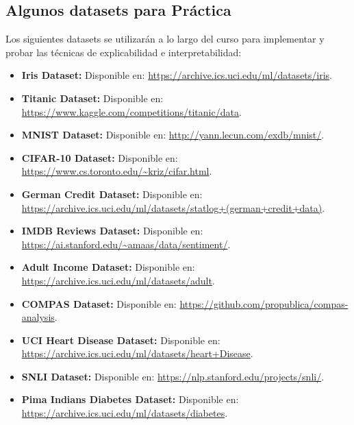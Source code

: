 \subsection*{Algunos datasets para Práctica}
Los siguientes datasets se utilizarán a lo largo del curso para implementar y probar las técnicas de explicabilidad e interpretabilidad:
\begin{itemize}
    \item \textbf{Iris Dataset:} Disponible en: \url{https://archive.ics.uci.edu/ml/datasets/iris}.
    \item \textbf{Titanic Dataset:} Disponible en: \url{https://www.kaggle.com/competitions/titanic/data}.
    \item \textbf{MNIST Dataset:} Disponible en: \url{http://yann.lecun.com/exdb/mnist/}.
    \item \textbf{CIFAR-10 Dataset:} Disponible en: \url{https://www.cs.toronto.edu/~kriz/cifar.html}.
    \item \textbf{German Credit Dataset:} Disponible en: \url{https://archive.ics.uci.edu/ml/datasets/statlog+(german+credit+data)}.
    \item \textbf{IMDB Reviews Dataset:} Disponible en: \url{https://ai.stanford.edu/~amaas/data/sentiment/}.
    \item \textbf{Adult Income Dataset:} Disponible en: \url{https://archive.ics.uci.edu/ml/datasets/adult}.
    \item \textbf{COMPAS Dataset:} Disponible en: \url{https://github.com/propublica/compas-analysis}.
    \item \textbf{UCI Heart Disease Dataset:} Disponible en: \url{https://archive.ics.uci.edu/ml/datasets/heart+Disease}.
    \item \textbf{SNLI Dataset:} Disponible en: \url{https://nlp.stanford.edu/projects/snli/}.
    \item \textbf{Pima Indians Diabetes Dataset:} Disponible en: \url{https://archive.ics.uci.edu/ml/datasets/diabetes}.
\end{itemize}


